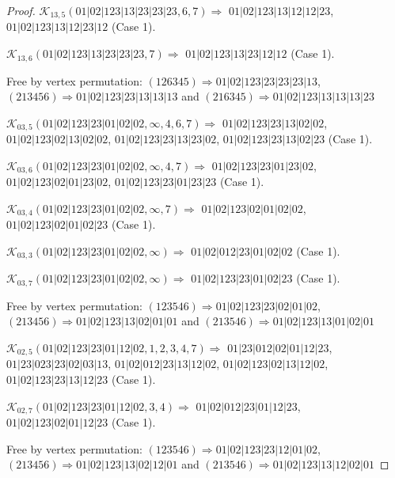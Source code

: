 \documentclass[12pt]{article}
\theoremstyle{plain}
\theoremstyle{definition}
\theoremstyle{remark}
\newcommand{\fancy}[1]{\mathcal{#1}}
\def\K{\fancy{K}}
\begin{document}
\begin{proof}
	
	
	\bigskip
	
	$\K_{13,5}(01|02|123|13|23|23|23,6, 7)\Rightarrow $ $01|02|123|13|12|12|23$, $01|02|123|13|12|23|12$ (Case 1).
	
	$\K_{13,6}(01|02|123|13|23|23|23,7)\Rightarrow $ $01|02|123|13|23|12|12$ (Case 1).
	
	
	
	Free by vertex permutation: $(1 2 6 3 4 5)\Rightarrow 01|02|123|23|23|23|13$, $(2 1 3 4 5 6)\Rightarrow 01|02|123|23|13|13|13$ and $(2 1 6 3 4 5)\Rightarrow 01|02|123|13|13|13|23$
	
	
	
	\bigskip
	
	$\K_{03,5}(01|02|123|23|01|02|02,\infty,4, 6, 7)\Rightarrow $ $01|02|123|23|13|02|02$, $01|02|123|02|13|02|02$, $01|02|123|23|13|23|02$, $01|02|123|23|13|02|23$ (Case 1).
	
	$\K_{03,6}(01|02|123|23|01|02|02,\infty,4, 7)\Rightarrow $ $01|02|123|23|01|23|02$, $01|02|123|02|01|23|02$, $01|02|123|23|01|23|23$ (Case 1).
	
	$\K_{03,4}(01|02|123|23|01|02|02,\infty,7)\Rightarrow $ $01|02|123|02|01|02|02$, $01|02|123|02|01|02|23$ (Case 1).
	
	$\K_{03,3}(01|02|123|23|01|02|02,\infty)\Rightarrow $ $01|02|012|23|01|02|02$ (Case 1).
	
	$\K_{03,7}(01|02|123|23|01|02|02,\infty)\Rightarrow $ $01|02|123|23|01|02|23$ (Case 1).
	
	
	
	Free by vertex permutation: $(1 2 3 5 4 6)\Rightarrow 01|02|123|23|02|01|02$, $(2 1 3 4 5 6)\Rightarrow 01|02|123|13|02|01|01$ and $(2 1 3 5 4 6)\Rightarrow 01|02|123|13|01|02|01$
	
	
	
	\bigskip
	
	$\K_{02,5}(01|02|123|23|01|12|02,1, 2, 3, 4, 7)\Rightarrow $ $01|23|012|02|01|12|23$, $01|23|023|23|02|03|13$, $01|02|012|23|13|12|02$, $01|02|123|02|13|12|02$, $01|02|123|23|13|12|23$ (Case 1).
	
	$\K_{02,7}(01|02|123|23|01|12|02,3, 4)\Rightarrow $ $01|02|012|23|01|12|23$, $01|02|123|02|01|12|23$ (Case 1).
	
	
	
	Free by vertex permutation: $(1 2 3 5 4 6)\Rightarrow 01|02|123|23|12|01|02$, $(2 1 3 4 5 6)\Rightarrow 01|02|123|13|02|12|01$ and $(2 1 3 5 4 6)\Rightarrow 01|02|123|13|12|02|01$
	
	
	

\end{proof}
\end{document}
